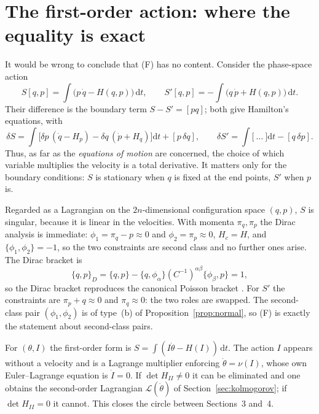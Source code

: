 \documentclass[11pt,a4paper]{article}
\theoremstyle{definition}
\theoremstyle{remark}
\newcommand{\dd}{\mathrm{d}}
\newcommand{\PB}[2]{\{#1,#2\}}
\newcommand{\weq}{\approx}
\begin{document}
\section{The first-order action: where the equality is exact}\label{sec:first-order}

It would be wrong to conclude that (F) has no content. Consider the phase-space action
\begin{equation}\label{eq:first-order}
S[q,p]=\int\bigl(p\,\dot q-H(q,p)\bigr)\,\dd t,\qquad
S'[q,p]=-\int\bigl(q\,\dot p+H(q,p)\bigr)\,\dd t .
\end{equation}
Their difference is the boundary term $S-S'=[pq]$; both give Hamilton's equations, with
\[
\delta S=\int\bigl[\delta p\,(\dot q-H_p)-\delta q\,(\dot p+H_q)\bigr]\dd t+[p\,\delta q],\qquad
\delta S'=\int\bigl[\ \dots\ \bigr]\dd t-[q\,\delta p].
\]
Thus, as far as the \emph{equations of motion} are concerned, the choice of which variable multiplies the velocity is a total derivative. It matters only for the boundary conditions: $S$ is stationary when $q$ is fixed at the end points, $S'$ when $p$ is.

Regarded as a Lagrangian on the $2n$-dimensional configuration space $(q,p)$, $S$ is singular, because it is linear in the velocities. With momenta $\pi_q,\pi_p$ the Dirac analysis is immediate: $\phi_1=\pi_q-p\weq0$ and $\phi_2=\pi_p\weq0$, $H_c=H$, and $\PB{\phi_1}{\phi_2}=-1$, so the two constraints are second class and no further ones arise. The Dirac bracket is
\[
\PB qp_D=\PB qp-\PB q{\phi_\alpha}(C^{-1})^{\alpha\beta}\PB{\phi_\beta}p=1 ,
\]
so the Dirac bracket reproduces the canonical Poisson bracket \cite{fj88}. For $S'$ the constraints are $\pi_p+q\weq0$ and $\pi_q\weq0$: the two roles are swapped. The second-class pair $(\phi_1,\phi_2)$ is of type~(b) of Proposition~\ref{prop:normal}, so (F) is exactly the statement about second-class pairs.

For $(\theta,I)$ the first-order form is $S=\int(I\dot\theta-H(I))\,\dd t$. The action $I$ appears without a velocity and is a Lagrange multiplier enforcing $\dot\theta=\nu(I)$, whose own Euler--Lagrange equation is $\dot I=0$. If $\det H_{II}\neq0$ it can be eliminated and one obtains the second-order Lagrangian $\mathcal L(\dot\theta)$ of Section~\ref{sec:kolmogorov}; if $\det H_{II}=0$ it cannot. This closes the circle between Sections~3 and~4.

\end{document}
